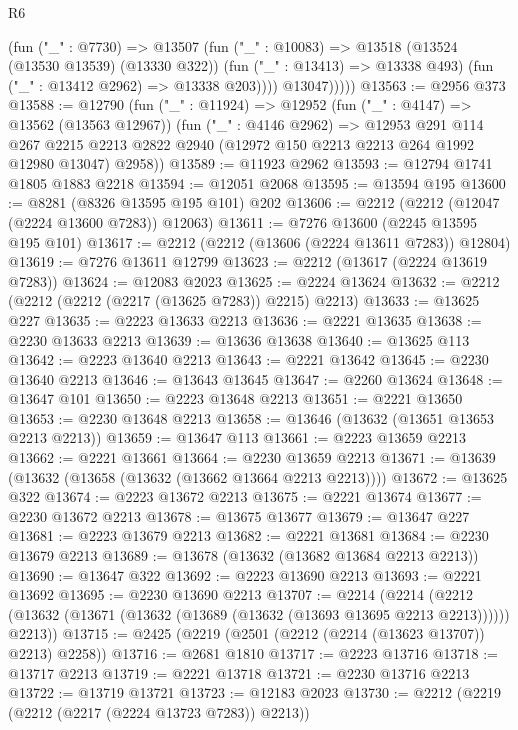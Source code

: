 \begin{lexlean}{R6}
\begin{coremodule}
                (fun ("_" : @7730) =>
                @13507
                  (fun ("_" : @10083) =>
                  @13518
                    (@13524 (@13530 @13539) (@13330 @322))
                    (fun ("_" : @13413) => @13338 @493)
                    (fun ("_" : @13412 @2962) => @13338 @203))))
              @13047)))))
@13563 := @2956 @373
@13588 := @12790
    (fun ("_" : @11924) =>
    @12952
      (fun ("_" : @4147) => @13562 (@13563 @12967))
      (fun ("_" : @4146 @2962) =>
      @12953
        @291
        @114
        @267
        @2215
        @2213
        @2822
        @2940
        (@12972 @150 @2213 @2213 @264 @1992 @12980 @13047)
        @2958))
@13589 := @11923 @2962
@13593 := @12794 @1741 @1805 @1883 @2218
@13594 := @12051 @2068
@13595 := @13594 @195
@13600 := @8281 (@8326 @13595 @195 @101) @202
@13606 := @2212 (@2212 (@12047 (@2224 @13600 @7283)) @12063)
@13611 := @7276 @13600 (@2245 @13595 @195 @101)
@13617 := @2212 (@2212 (@13606 (@2224 @13611 @7283)) @12804)
@13619 := @7276 @13611 @12799
@13623 := @2212 (@13617 (@2224 @13619 @7283))
@13624 := @12083 @2023
@13625 := @2224 @13624
@13632 := @2212 (@2212 (@2212 (@2217 (@13625 @7283)) @2215) @2213)
@13633 := @13625 @227
@13635 := @2223 @13633 @2213
@13636 := @2221 @13635
@13638 := @2230 @13633 @2213
@13639 := @13636 @13638
@13640 := @13625 @113
@13642 := @2223 @13640 @2213
@13643 := @2221 @13642
@13645 := @2230 @13640 @2213
@13646 := @13643 @13645
@13647 := @2260 @13624
@13648 := @13647 @101
@13650 := @2223 @13648 @2213
@13651 := @2221 @13650
@13653 := @2230 @13648 @2213
@13658 := @13646 (@13632 (@13651 @13653 @2213 @2213))
@13659 := @13647 @113
@13661 := @2223 @13659 @2213
@13662 := @2221 @13661
@13664 := @2230 @13659 @2213
@13671 := @13639 (@13632 (@13658 (@13632 (@13662 @13664 @2213 @2213))))
@13672 := @13625 @322
@13674 := @2223 @13672 @2213
@13675 := @2221 @13674
@13677 := @2230 @13672 @2213
@13678 := @13675 @13677
@13679 := @13647 @227
@13681 := @2223 @13679 @2213
@13682 := @2221 @13681
@13684 := @2230 @13679 @2213
@13689 := @13678 (@13632 (@13682 @13684 @2213 @2213))
@13690 := @13647 @322
@13692 := @2223 @13690 @2213
@13693 := @2221 @13692
@13695 := @2230 @13690 @2213
@13707 := @2214
    (@2214 (@2212 (@13632 (@13671 (@13632 (@13689 (@13632 (@13693 @13695 @2213 @2213)))))) @2213))
@13715 := @2425 (@2219 (@2501 (@2212 (@2214 (@13623 @13707)) @2213) @2258))
@13716 := @2681 @1810
@13717 := @2223 @13716
@13718 := @13717 @2213
@13719 := @2221 @13718
@13721 := @2230 @13716 @2213
@13722 := @13719 @13721
@13723 := @12183 @2023
@13730 := @2212 (@2219 (@2212 (@2217 (@2224 @13723 @7283)) @2213))

\end{coremodule}
\end{lexlean}
